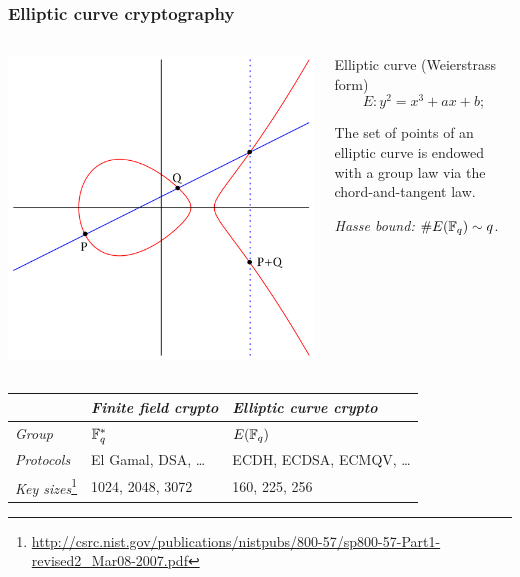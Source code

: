 \documentclass[10pt,usepdftitle=false]{beamer}
\begin{document}
\begin{frame}
  \frametitle{Elliptic curve cryptography}

  \vspace{-1mm}

  \begin{columns}
    \begin{column}{0.4\textwidth}
      \includegraphics[width=\textwidth]{../isogeny/ec-add.pdf}
    \end{column}
    \begin{column}{0.55\textwidth}
      \begin{block}{Elliptic curve (Weierstrass form)}
        \[E : y^2 = x^3 + ax + b\text{;}\]
      
        The set of points of an elliptic curve is endowed with a group
        law via the chord-and-tangent law.
      \end{block}
    
      \begin{block}{}
        \emph{Hasse bound:} $\# E(\mathbb{F}_q) \sim q$.
      \end{block}
    \end{column}
  \end{columns}

  \begin{center}
    \begin{tabular}{l | l | l}
      &\emph{\textbf{Finite field crypto}} & \emph{\textbf{Elliptic curve crypto}}\\
      \hline
      \emph{Group} & $\mathbb{F}_q^\ast$ & $E(\mathbb{F}_q)$\\
      \emph{Protocols} & El Gamal, DSA, \dots & ECDH, ECDSA, ECMQV, \dots\\
      \emph{Key sizes}\footnote{\url{http://csrc.nist.gov/publications/nistpubs/800-57/sp800-57-Part1-revised2_Mar08-2007.pdf}}  & 1024, 2048, 3072 & 160, 225, 256 \\
    \end{tabular}
  \end{center}


\end{frame}
\end{document}
